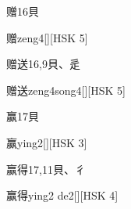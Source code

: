 \begin{entry}{赠}{16}{⾙}
  \begin{phonetics}{赠}{zeng4}[][HSK 5]
  \end{phonetics}
\end{entry}

\begin{entry}{赠送}{16,9}{⾙、⾡}
  \begin{phonetics}{赠送}{zeng4song4}[][HSK 5]
  \end{phonetics}
\end{entry}

\begin{entry}{赢}{17}{⾙}
  \begin{phonetics}{赢}{ying2}[][HSK 3]
  \end{phonetics}
\end{entry}

\begin{entry}{赢得}{17,11}{⾙、⼻}
  \begin{phonetics}{赢得}{ying2 de2}[][HSK 4]
  \end{phonetics}
\end{entry}


